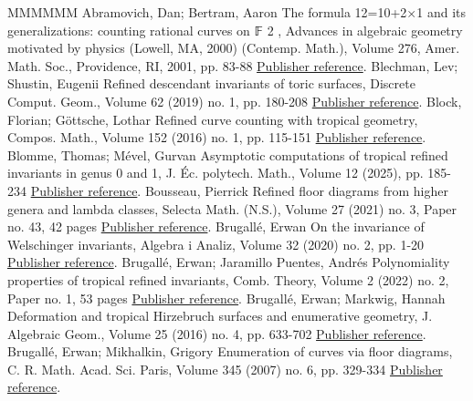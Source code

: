 \documentclass[11pt]{article}
\theoremstyle{definition}
\numberwithin{equation}{section}
\theoremstyle{plain}
\begin{document}
\begin{thebibliography}{MMMMMM}
 Abramovich, Dan; Bertram, Aaron The formula 12=10+2×1 and its generalizations: counting rational curves on 𝔽 2 , Advances in algebraic geometry motivated by physics (Lowell, MA, 2000) (Contemp. Math.), Volume 276, Amer. Math. Soc., Providence, RI, 2001, pp. 83-88 \href{https://alco.centre-mersenne.org/articles/10.5802/alco.444/#abramovich-2001-formula}{Publisher reference}.
 Blechman, Lev; Shustin, Eugenii Refined descendant invariants of toric surfaces, Discrete Comput. Geom., Volume 62 (2019) no. 1, pp. 180-208 \href{https://alco.centre-mersenne.org/articles/10.5802/alco.444/#blechman-2019-refined}{Publisher reference}.
 Block, Florian; Göttsche, Lothar Refined curve counting with tropical geometry, Compos. Math., Volume 152 (2016) no. 1, pp. 115-151 \href{https://alco.centre-mersenne.org/articles/10.5802/alco.444/#block_refined_2016}{Publisher reference}.
 Blomme, Thomas; Mével, Gurvan Asymptotic computations of tropical refined invariants in genus 0 and 1, J. Éc. polytech. Math., Volume 12 (2025), pp. 185-234 \href{https://alco.centre-mersenne.org/articles/10.5802/alco.444/#blomme-2025-asymptotic}{Publisher reference}.
 Bousseau, Pierrick Refined floor diagrams from higher genera and lambda classes, Selecta Math. (N.S.), Volume 27 (2021) no. 3, Paper no. 43, 42 pages \href{https://alco.centre-mersenne.org/articles/10.5802/alco.444/#bousseau_refined_2021}{Publisher reference}.
 Brugallé, Erwan On the invariance of Welschinger invariants, Algebra i Analiz, Volume 32 (2020) no. 2, pp. 1-20 \href{https://alco.centre-mersenne.org/articles/10.5802/alco.444/#brugalle-2020-invariance}{Publisher reference}.
 Brugallé, Erwan; Jaramillo Puentes, Andrés Polynomiality properties of tropical refined invariants, Comb. Theory, Volume 2 (2022) no. 2, Paper no. 1, 53 pages \href{https://alco.centre-mersenne.org/articles/10.5802/alco.444/#brugalle_polynomiality_2022}{Publisher reference}.
 Brugallé, Erwan; Markwig, Hannah Deformation and tropical Hirzebruch surfaces and enumerative geometry, J. Algebraic Geom., Volume 25 (2016) no. 4, pp. 633-702 \href{https://alco.centre-mersenne.org/articles/10.5802/alco.444/#brugalle-2016-deformation}{Publisher reference}.
 Brugallé, Erwan; Mikhalkin, Grigory Enumeration of curves via floor diagrams, C. R. Math. Acad. Sci. Paris, Volume 345 (2007) no. 6, pp. 329-334 \href{https://alco.centre-mersenne.org/articles/10.5802/alco.444/#brugalle_enumeration_2007}{Publisher reference}.

\end{thebibliography}
\end{document}

